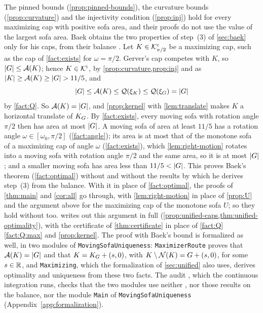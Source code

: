 \begin{remark}\label{rem:second}
The pinned bounds (\cref{prop:pinned-bounds}), the curvature bounds
(\cref{prop:curvature}) and the injectivity condition (\cref{prop:inj}) hold
for every maximizing cap with positive sofa area, and their proofs do not use
the value of the largest sofa area. Baek obtains the two properties of
step~(3) of \cref{sec:baek} only for his caps, from their balance
. Let $K\in\mathcal{K}^{\mathrm{c}}_{\pi/2}$ be a maximizing cap,
such as the cap of \cref{fact:exists} for $\omega=\pi/2$. Gerver's cap competes
with $K$, so $\lvert G\rvert\le\mathcal{A}(K)$; hence $K\in\mathcal{K}^{\mathrm{i}}$, by
\cref{prop:curvature,prop:inj} and as $\lvert K\rvert\ge\mathcal{A}(K)\ge\lvert G\rvert>11/5$, and
\[
  \lvert G\rvert\le\mathcal{A}(K)\le\mathcal{Q}(\xi_K)\le\mathcal{Q}(\xi_G)=\lvert G\rvert
\]
by \cref{fact:Q}. So $\mathcal{A}(K)=\lvert G\rvert$, and \cref{prop:kernel} with
\cref{lem:translate} makes $K$ a horizontal translate of $K_G$. By
\cref{fact:exists}, every moving sofa with rotation angle $\pi/2$ then has area
at most $\lvert G\rvert$. A moving sofa of area at least $11/5$ has a rotation angle
$\omega\in[\omega_0,\pi/2]$ (\cref{fact:angle}); its area is at most that of
the monotone sofa of a maximizing cap of angle $\omega$ (\cref{fact:exists}),
which \cref{lem:right-motion} rotates into a moving sofa with rotation angle
$\pi/2$ and the same area, so it is at most $\lvert G\rvert$; and a smaller moving
sofa has area less than $11/5<\lvert G\rvert$. This proves Baek's theorem
(\cref{fact:optimal}) without
 and without the results by which he derives step~(3) from the
balance. With it in place of \cref{fact:optimal}, the proofs of \cref{thm:main}
and \cref{cor:all} go through, with \cref{lem:right-motion} in place of
\cref{prop:U} and the argument above for the maximizing cap of the monotone sofa
$U$; so they hold without  too.  writes out
this argument in full (\cref{prop:unified-caps,thm:unified-optimality}), with
the certificate of \cref{thm:certificate} in place of
\cref{fact:Q}\ref{fact:Q:max} and \cref{prop:kernel}. The proof with Baek's
bound is formalized as well, in two modules of \texttt{MovingSofaUniqueness}:
\texttt{MaximizerRoute} proves that $\mathcal{A}(K)=\lvert G\rvert$ and that $K=K_G+(s,0)$, with
$K\setminus\mathcal{N}(K)=G+(s,0)$, for some $s\in\mathbb{R}$, and \texttt{Maximizing}, which
the formalization of \cref{sec:unified} also uses, derives optimality and
uniqueness from these two facts. The audit
, which the continuous integration runs,
checks that the two modules use neither , nor those results on
the balance, nor the module \texttt{Main} of \texttt{MovingSofaUniqueness}
(Appendix~\ref{app:formalization}).
\end{remark}

